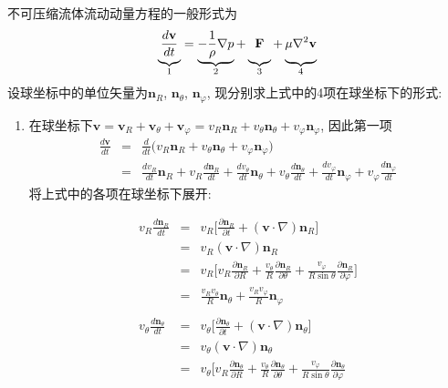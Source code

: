 \begin{solution}
\noindent 不可压缩流体流动动量方程的一般形式为
\[
\underbrace{\frac{d\mathbf{v}}{dt}\vphantom{\frac{1}{\rho}}}_{1} = \underbrace{- \frac{1}{\rho}\nabla p}_{2} + \underbrace{\mathbf{F}\vphantom{\frac{1}{\rho}}}_{3} +\underbrace{\mu\nabla^2\mathbf{v}\vphantom{\frac{1}{\rho}}}_{4}
\]
设球坐标中的单位矢量为$\mathbf{n}_R$, $ \mathbf{n}_\theta$, $\mathbf{n}_\varphi$, 现分别求上式中的4项在球坐标下的形式:
\begin{enumerate}
\item 在球坐标下$\mathbf{v} = \mathbf{v}_R + \mathbf{v}_\theta + \mathbf{v}_\varphi = v_R\mathbf{n}_R + v_\theta\mathbf{n}_\theta + v_\varphi\mathbf{n}_\varphi$, 因此第一项
{\setlength\arraycolsep{1pt}
\begin{eqnarray}
\frac{d\mathbf{v}}{dt} & = & \frac{d}{dt}\Big(v_R\mathbf{n}_R+v_\theta \mathbf{n}_\theta+v_\varphi\mathbf{n}_\varphi\Big)
\nonumber\\
& = & \frac{dv_R}{dt}\mathbf{n}_R + v_R\frac{d\mathbf{n}_R}{dt}
+ \frac{dv_\theta}{dt}\mathbf{n}_\theta + v_\theta\frac{d\mathbf{n}_\theta}{dt}
+ \frac{dv_\varphi}{dt}\mathbf{n}_\varphi + v_\varphi\frac{d\mathbf{n}_\varphi}{dt}
\nonumber
\end{eqnarray}}
将上式中的各项在球坐标下展开:
\begin{multicols}{2}
\setlength{\abovedisplayskip}{-5pt}
\begin{eqnarray}
v_R\frac{d\mathbf{n}_R}{dt} & = & v_R\Big[\frac{\partial\mathbf{n}_R}{\partial t} + (\mathbf{v}\cdot \nabla)\mathbf{n}_R\Big]\nonumber\\
 & = &  v_R(\mathbf{v}\cdot \nabla)\mathbf{n}_R
\nonumber\\
& = & v_R\Big[
v_R
\frac{\partial \mathbf{n}_R}{\partial R} + \frac{v_\theta}{R}\frac{\partial\mathbf{n}_R}{\partial\theta}
+ \frac{v_\varphi}{R\sin\theta}\frac{\partial\mathbf{n}_R}{\partial\varphi}
\Big]\nonumber\\
& = &  \frac{v_Rv_\theta}{R}\mathbf{n}_\theta + \frac{v_Rv_\varphi}{R}\mathbf{n}_\varphi
%
\nonumber\\
\nonumber\\
%
v_\theta\frac{d\mathbf{n}_\theta}{dt} & = & v_\theta\Big[\frac{\partial\mathbf{n}_\theta}{\partial t} + (\mathbf{v}\cdot \nabla)\mathbf{n}_\theta\Big]\nonumber\\
 & = &  v_\theta(\mathbf{v}\cdot \nabla)\mathbf{n}_\theta
\nonumber\\
& = & v_\theta\Big[
v_R
\frac{\partial \mathbf{n}_\theta}{\partial R} + \frac{v_\theta}{R}\frac{\partial\mathbf{n}_\theta}{\partial\theta}
+ \frac{v_\varphi}{R\sin\theta}\frac{\partial\mathbf{n}_\theta}{\partial\varphi}

\end{eqnarray}
\end{multicols}
\end{enumerate}
\end{solution}

